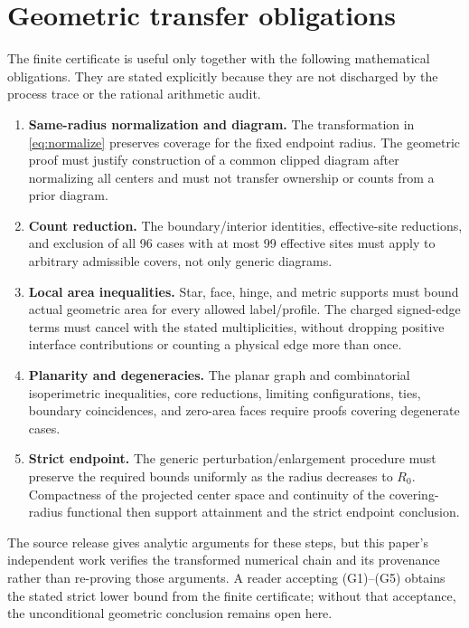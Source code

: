 \documentclass[11pt]{article}
\newcommand{\cR}{R_0}
\begin{document}
\section{Geometric transfer obligations}
\label{sec:geometry}
The finite certificate is useful only together with the following mathematical obligations. They are stated explicitly because they are not discharged by the process trace or the rational arithmetic audit.
\begin{enumerate}[label=(G\arabic*)]
 \item \textbf{Same-radius normalization and diagram.} The transformation in \eqref{eq:normalize} preserves coverage for the fixed endpoint radius. The geometric proof must justify construction of a common clipped diagram after normalizing all centers and must not transfer ownership or counts from a prior diagram.
 \item \textbf{Count reduction.} The boundary/interior identities, effective-site reductions, and exclusion of all 96 cases with at most 99 effective sites must apply to arbitrary admissible covers, not only generic diagrams.
 \item \textbf{Local area inequalities.} Star, face, hinge, and metric supports must bound actual geometric area for every allowed label/profile. The charged signed-edge terms must cancel with the stated multiplicities, without dropping positive interface contributions or counting a physical edge more than once.
 \item \textbf{Planarity and degeneracies.} The planar graph and combinatorial isoperimetric inequalities, core reductions, limiting configurations, ties, boundary coincidences, and zero-area faces require proofs covering degenerate cases.
 \item \textbf{Strict endpoint.} The generic perturbation/enlargement procedure must preserve the required bounds uniformly as the radius decreases to $\cR$. Compactness of the projected center space and continuity of the covering-radius functional then support attainment and the strict endpoint conclusion.
\end{enumerate}
The source release gives analytic arguments for these steps, but this paper's independent work verifies the transformed numerical chain and its provenance rather than re-proving those arguments. A reader accepting (G1)--(G5) obtains the stated strict lower bound from the finite certificate; without that acceptance, the unconditional geometric conclusion remains open here.
\end{document}
